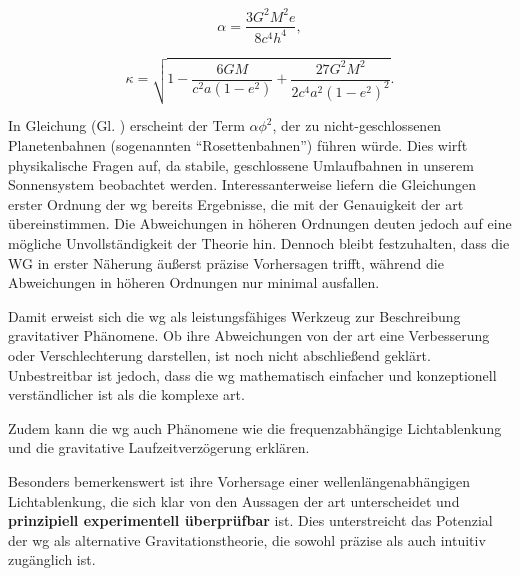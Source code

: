 \begin{equation}
\alpha = \frac{3G^2 M^2 e}{8c^4 h^4},
\end{equation}

\begin{equation}
\kappa = \sqrt{1 - \frac{6GM}{c^2 a(1 - e^2)} + \frac{27G^2 M^2}{2c^4 a^2 (1 - e^2)^2}}.
\end{equation}

In Gleichung (Gl. ) erscheint der Term $\alpha \phi^2$, der zu nicht-geschlossenen Planetenbahnen (sogenannten \enquote{Rosettenbahnen}) führen würde.
Dies wirft physikalische Fragen auf, da stabile, geschlossene Umlaufbahnen in unserem Sonnensystem beobachtet werden. Interessanterweise liefern die Gleichungen erster Ordnung
der \gls{wg} bereits Ergebnisse, die mit der Genauigkeit der \gls{art} übereinstimmen. Die Abweichungen in höheren Ordnungen deuten jedoch auf eine mögliche Unvollständigkeit der
Theorie hin. Dennoch bleibt festzuhalten, dass die WG in erster Näherung äußerst präzise Vorhersagen trifft, während die Abweichungen in höheren Ordnungen nur minimal ausfallen.

Damit erweist sich die \gls{wg} als leistungsfähiges Werkzeug zur Beschreibung gravitativer Phänomene. Ob ihre Abweichungen von der \gls{art} eine Verbesserung oder Verschlechterung
darstellen, ist noch nicht abschließend geklärt. Unbestreitbar ist jedoch, dass die \gls{wg} mathematisch einfacher und konzeptionell verständlicher ist als die komplexe \gls{art}.

Zudem kann die \gls{wg} auch Phänomene wie die frequenzabhängige Lichtablenkung und die gravitative Laufzeitverzögerung erklären.

Besonders bemerkenswert ist ihre Vorhersage einer
wellenlängenabhängigen Lichtablenkung, die sich klar von den Aussagen der \gls{art} unterscheidet und \textbf{prinzipiell experimentell überprüfbar} ist. Dies unterstreicht das Potenzial
der \gls{wg} als alternative Gravitationstheorie, die sowohl präzise als auch intuitiv zugänglich ist.
